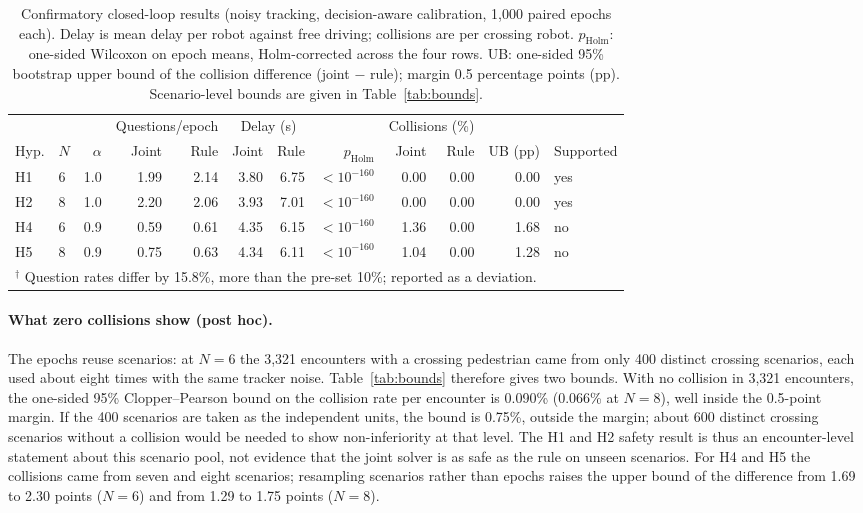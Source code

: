 \documentclass[a4paper,fleqn]{cas-dc}
\begin{document}
\begin{table}
\centering
\caption{Confirmatory closed-loop results (noisy tracking, decision-aware calibration, 1{,}000 paired epochs each). Delay is mean delay per robot against free driving; collisions are per crossing robot. $p_{\text{Holm}}$: one-sided Wilcoxon on epoch means, Holm-corrected across the four rows. UB: one-sided 95\% bootstrap upper bound of the collision difference (joint $-$ rule); margin 0.5 percentage points (pp). Scenario-level bounds are given in Table~\ref{tab:bounds}.}
\label{tab:conf}
\begin{tabular*}{\textwidth}{@{\extracolsep{\fill}}llrrrrrrrrrl}
\toprule
 & & & \multicolumn{2}{c}{Questions/epoch} & \multicolumn{2}{c}{Delay (s)} & & \multicolumn{2}{c}{Collisions (\%)} & & \\
\cmidrule(lr){4-5}\cmidrule(lr){6-7}\cmidrule(lr){9-10}
Hyp. & $N$ & $\alpha$ & Joint & Rule & Joint & Rule & $p_{\text{Holm}}$ & Joint & Rule & UB (pp) & Supported \\
\midrule
H1 & 6 & 1.0 & 1.99 & 2.14 & 3.80 & 6.75 & $<10^{-160}$ & 0.00 & 0.00 & 0.00 & yes \\
H2 & 8 & 1.0 & 2.20 & 2.06 & 3.93 & 7.01 & $<10^{-160}$ & 0.00 & 0.00 & 0.00 & yes \\
H4 & 6 & 0.9 & 0.59 & 0.61 & 4.35 & 6.15 & $<10^{-160}$ & 1.36 & 0.00 & 1.68 & no \\
H5 & 8 & 0.9 & 0.75 & 0.63\rlap{$^{\dagger}$} & 4.34 & 6.11 & $<10^{-160}$ & 1.04 & 0.00 & 1.28 & no \\
\bottomrule
\multicolumn{12}{l}{\footnotesize $^{\dagger}$ Question rates differ by 15.8\%, more than the pre-set 10\%; reported as a deviation.}
\end{tabular*}
\end{table}

\paragraph{What zero collisions show (post hoc).} The epochs reuse scenarios: at $N = 6$ the 3{,}321 encounters with a crossing pedestrian came from only 400 distinct crossing scenarios, each used about eight times with the same tracker noise. Table~\ref{tab:bounds} therefore gives two bounds. With no collision in 3{,}321 encounters, the one-sided 95\% Clopper--Pearson bound on the collision rate per encounter is 0.090\% (0.066\% at $N = 8$), well inside the 0.5-point margin. If the 400 scenarios are taken as the independent units, the bound is 0.75\%, outside the margin; about 600 distinct crossing scenarios without a collision would be needed to show non-inferiority at that level. The H1 and H2 safety result is thus an encounter-level statement about this scenario pool, not evidence that the joint solver is as safe as the rule on unseen scenarios. For H4 and H5 the collisions came from seven and eight scenarios; resampling scenarios rather than epochs raises the upper bound of the difference from 1.69 to 2.30 points ($N = 6$) and from 1.29 to 1.75 points ($N = 8$).
\end{document}
